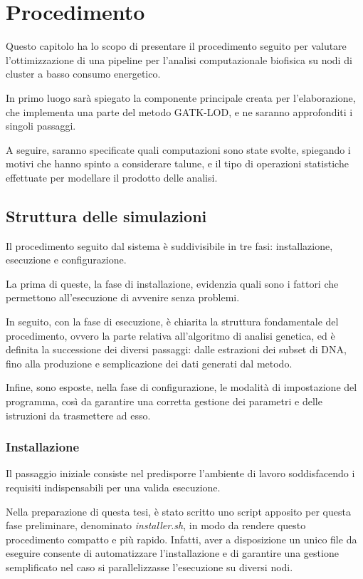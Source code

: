 \chapter{Procedimento}
Questo capitolo ha lo scopo di presentare il procedimento seguito per valutare l'ottimizzazione di una pipeline per l'analisi computazionale biofisica su nodi di cluster a basso consumo energetico.


In primo luogo sarà spiegato la componente principale creata per l'elaborazione, che implementa una parte del metodo GATK-LOD, e ne saranno approfonditi i singoli passaggi.

A seguire, saranno specificate quali computazioni sono state svolte, spiegando i motivi che hanno spinto a considerare talune, e il tipo di operazioni statistiche effettuate per modellare il prodotto delle analisi.



\section{Struttura delle simulazioni}
Il procedimento seguito dal sistema è suddivisibile in tre fasi: installazione, esecuzione e configurazione.


La prima di queste, la fase di installazione, evidenzia quali sono i fattori che permettono all'esecuzione di avvenire senza problemi.


In seguito, con la fase di esecuzione, è chiarita la struttura fondamentale del procedimento, ovvero la parte relativa all'algoritmo di analisi genetica, ed è definita la successione dei diversi passaggi: dalle estrazioni dei subset di DNA, fino alla produzione e semplicazione dei dati generati dal metodo.


Infine, sono esposte, nella fase di configurazione, le modalità di impostazione del programma, così da garantire una corretta gestione dei parametri e delle istruzioni da trasmettere ad esso.


\subsection{Installazione}
Il passaggio iniziale consiste nel predisporre l'ambiente di lavoro soddisfacendo i requisiti indispensabili per una valida esecuzione.

Nella preparazione di questa tesi, è stato scritto uno script apposito per questa fase preliminare, denominato \textit{installer.sh}, in modo da rendere questo procedimento compatto e più rapido.
Infatti, aver a disposizione un unico file da eseguire consente di automatizzare l'installazione e di garantire una gestione semplificato nel caso si parallelizzasse l'esecuzione su diversi nodi.

